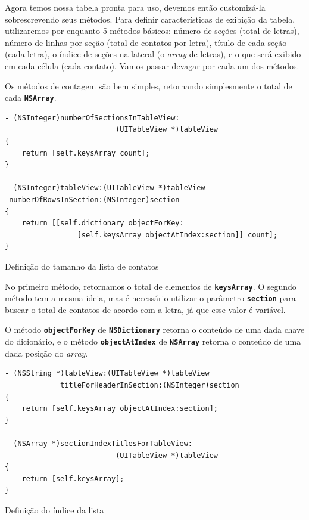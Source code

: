 \documentclass[a4paper,12pt,brazil,doubleside]{book}
\begin{document}
\begin{singlespace}
Agora temos nossa tabela pronta para uso, devemos então customizá-la sobrescrevendo seus métodos. Para definir características de exibição da tabela, utilizaremos por enquanto 5 métodos básicos: número de seções (total de letras), número de linhas por seção (total de contatos por letra), título de cada seção (cada letra), o índice de seções na lateral (o \emph{array} de letras), e o que será exibido em cada célula (cada contato). Vamos passar devagar por cada um dos métodos.

Os métodos de contagem são bem simples, retornando simplesmente o total de cada \texttt{\textbf{NSArray}}.

\begin{listing}[H]
\begin{verbatim}
- (NSInteger)numberOfSectionsInTableView:
                          (UITableView *)tableView
{
    return [self.keysArray count];
}

- (NSInteger)tableView:(UITableView *)tableView
 numberOfRowsInSection:(NSInteger)section
{
    return [[self.dictionary objectForKey:
                 [self.keysArray objectAtIndex:section]] count];
}
\end{verbatim}
\caption{Definição do tamanho da lista de contatos}
\end{listing}


No primeiro método, retornamos o total de elementos de \texttt{\textbf{keysArray}}. O segundo método tem a mesma ideia, mas é necessário utilizar o parâmetro \texttt{\textbf{section}} para buscar o total de contatos de acordo com a letra, já que esse valor é variável.

O método \texttt{\textbf{objectForKey}} de \texttt{\textbf{NSDictionary}} retorna o conteúdo de uma dada chave do dicionário, e o método \texttt{\textbf{objectAtIndex}} de \texttt{\textbf{NSArray}} retorna o conteúdo de uma dada posição do \emph{array}.

\begin{listing}[H]
\begin{verbatim}
- (NSString *)tableView:(UITableView *)tableView
             titleForHeaderInSection:(NSInteger)section
{
    return [self.keysArray objectAtIndex:section];
}

- (NSArray *)sectionIndexTitlesForTableView:
                          (UITableView *)tableView
{    
    return [self.keysArray];
}
\end{verbatim}
\caption{Definição do índice da lista}
\end{listing}



\end{singlespace}
\end{document}
